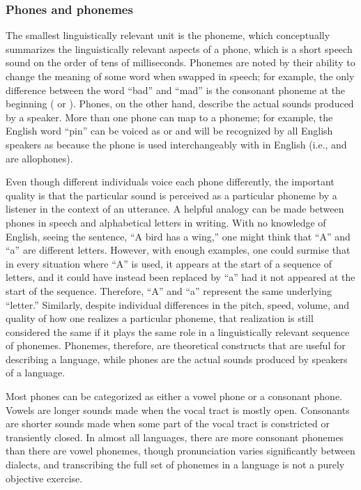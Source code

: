 \subsubsection{Phones and phonemes}

The smallest linguistically relevant unit
is the phoneme, which conceptually
summarizes the linguistically relevant
aspects of a phone,
which is a short speech sound
on the order of tens of milliseconds.
Phonemes are noted by their ability
to change the meaning of some word
when swapped in speech;
for example, the only difference between
the word ``bad'' and ``mad'' is the
consonant phoneme
at the beginning
( or ).
Phones, on the other hand,
describe the actual sounds
produced by a speaker.
More than one phone can map
to a phoneme;
for example, the English word
``pin'' can be voiced as
\ipa{[pIn]} or \ipa{[p\super{h}In]}
and will be recognized by
all English speakers
as  because
the \ipa{[p\super{h}]} phone
is used interchangeably with
\ipa{[p]} in English
(i.e., \ipa{[p\super{h}]} and \ipa{[p]}
are allophones).

Even though different individuals
voice each phone differently,
the important quality is that
the particular sound is perceived
as a particular phoneme
by a listener
in the context of an utterance.
A helpful analogy can be made between
phones in speech
and alphabetical letters in writing.
With no knowledge of English,
seeing the sentence,
``A bird has a wing,''
one might think that ``A'' and ``a''
are different letters.
However, with enough examples,
one could surmise that in every situation
where ``A'' is used, it appears at the
start of a sequence of letters,
and it could have instead
been replaced by ``a''
had it not appeared at the start of the sequence.
Therefore, ``A'' and ``a'' represent
the same underlying ``letter.''
Similarly, despite individual differences
in the pitch, speed, volume, and quality
of how one realizes a particular phoneme,
that realization is still considered the same
if it plays the same role
in a linguistically relevant sequence of phonemes.
Phonemes, therefore, are theoretical constructs
that are useful for describing a language,
while phones are the actual sounds produced
by speakers of a language.

Most phones can be categorized
as either a vowel phone or a consonant phone.
Vowels are longer sounds
made when the vocal tract is mostly open.
Consonants are shorter sounds
made when some part of the vocal tract
is constricted or transiently closed.
In almost all languages,
there are more consonant phonemes
than there are vowel phonemes,
though pronunciation varies significantly
between dialects,
and transcribing the full set of
phonemes in a language is
not a purely objective exercise.

